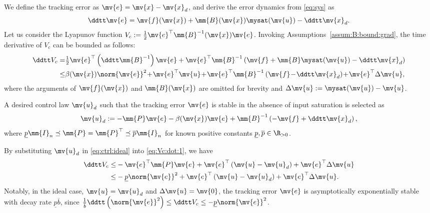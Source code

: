 \documentclass[letterpaper, journal]{IEEEtran}
\begin{document}
We define the tracking error as $\mv{e} = \mv{x} - \mv{x}_d$, and derive the error dynamics from \eqref{eq:sys} as
\begin{equation} \label{eq:error:dyn}
    \ddtt\mv{e}
    =
    \mv{f}(\mv{x}) + \mm{B}(\mv{x})\mysat(\mv{u}) - \ddtt\mv{x}_d
    .
\end{equation}
Let us consider the Lyapunov function $V_c:=\tfrac{1}{2}\mv{e}^\top\mm{B}^{-1}(\mv{x})\mv{e}$.
Invoking Assumptions~\ref{assum:B:bound:grad}, the time derivative of $V_c$ can be bounded as follows:
\begin{align} \label{eq:Vc:dot:1} \nonumber
  \ddtt V_c
  =&
  \tfrac{1}{2}\mv{e}^\top
  \left(
    \ddtt\mm{B}^{-1}
  \right)
  \mv{e}
  +
  \mv{e}^\top\mm{B}^{-1}
  \left(
    \mv{f} + \mm{B}\mysat(\mv{u}) 
    - \ddtt\mv{x}_d
  \right)
  \\
  \le&
  \beta(\mv{x})\norm{\mv{e}}^2
  \!+\!
  \mv{e}^\top\mv{u}
  \!+\!
  \mv{e}^\top\mm{B}^{-1}
  \left(
    \mv{f} \!-\! \ddtt\mv{x}_d
  \right)
  \!+\!
  \mv{e}^\top
  \Delta\mv{u}
  ,
\end{align}
where the arguments of $\mv{f}(\mv{x})$ and $\mm{B}(\mv{x})$ are omitted for brevity and $\Delta\mv{u} := \mysat(\mv{u}) - \mv{u}$.

A desired control law $\mv{u}_d$ such that the tracking error $\mv{e}$ is stable in the absence of input saturation is selected as 
\begin{equation} \label{eq:ctrl:ideal}
  \mv{u}_d
  :=
  -
  \mm{P}
  \mv{e}
  - 
  \beta(\mv{x})\mv{e}
  +
  \mm{B}^{-1}
  \left(
    - \mv{f} 
    + \ddtt\mv{x}_d
  \right)
  ,
\end{equation}
where $\underline{p}\mm{I}_n \preceq \mm{P}=\mm{P}^\top \preceq \overline{p}\mm{I}_n$ for known positive constants $\underline{p},\overline{p}\in\R_{>0}$.

By substituting $\mv{u}_d$ in \eqref{eq:ctrl:ideal} into \eqref{eq:Vc:dot:1}, we have
\begin{align} \label{eq:Vc:dot:2} 
  \ddtt V_c
  \le &
  -\mv{e}^\top
  \mm{P}
  \mv{e}
  +
  \mv{e}^\top
  \left(
    \mv{u} - \mv{u}_d
  \right)
  +
  \mv{e}^\top
  \Delta\mv{u}
  \\ \nonumber
  \le & 
  -
  \underline{p}\norm{\mv{e}}^2
  +
  \mv{e}^\top
  \left(
    \mv{u} - \mv{u}_d       
  \right)
  +
  \mv{e}^\top
    \Delta\mv{u}
  .
\end{align}
Notably, in the ideal case, \ie $\mv{u} = \mv{u}_d$ and $\Delta\mv{u} = \mv{0}$, the tracking error $\mv{e}$ is asymptotically exponentially stable with decay rate $\underline{p}\overline{b}$, since 
$
  \tfrac{1}{\overline{b}}
  \ddtt
  \left(
    \norm{\mv{e}}^2
  \right)
  \le
  \ddtt V_c 
  \le 
  -\underline{p}\norm{\mv{e}}^2
$.
\end{document}
